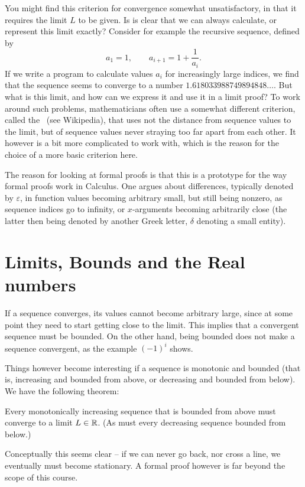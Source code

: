 \begin{note}
\label{cauchycrit}
You might find this criterion for convergence somewhat unsatisfactory, in
that it requires the limit $L$ to be given. Is is clear that we can always
calculate, or represent this limit exactly? Consider for example the
recursive sequence, defined by
\[
a_1=1,\qquad a_{i+1}=1+\frac{1}{a_i}.
\]
If we write a program to calculate values $a_i$ for increasingly large
indices, we find that the sequence seems to converge to a number
$1.618033988749894848\ldots$. But what is this limit, and how can we express it and use it in a limit proof?  To work
around such problems, mathematicians often use a somewhat different
criterion, called the~ (see Wikipedia), that uses
not the distance from sequence values to the limit, but of sequence values
never straying too far apart from each other. It however is a bit more
complicated to work with, which is the reason for the choice of a more basic
criterion here.
\end{note}

The reason for looking at formal proofs is that this is a prototype for the
way formal proofs work in Calculus. One argues about differences, typically denoted
by $\varepsilon$, in function values becoming arbitrary small, but still
being nonzero, as sequence indices go to infinity, or $x$-arguments becoming
arbitrarily close (the latter then being denoted by another Greek letter, 
$\delta$ denoting a small entity).

\section{Limits, Bounds and the Real numbers}

If a sequence converges, its values cannot become arbitrary large, since at some point
they need to start getting close to the limit. This implies that a convergent sequence
must be bounded.
On the other hand, being bounded does not make a sequence
convergent, as the example $(-1)^i$ shows.

Things however become interesting if a sequence is monotonic and bounded (that is,
increasing and bounded from above, or decreasing and bounded from below). We have the
following theorem:
\begin{thm}
Every monotonically increasing sequence that is bounded from above must converge to a
limit $L\in{\mathbb R}$. (As must every decreasing sequence bounded from below.)
\end{thm}
Conceptually this seems clear -- if we can never go back, nor cross a line, we eventually
must become stationary. A formal proof however is far beyond the scope of this course.

